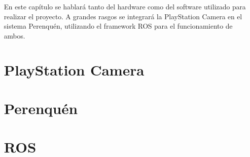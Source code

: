 
En este capítulo se hablará tanto del hardware como del software utilizado para
realizar el proyecto. A grandes rasgos se integrará la PlayStation Camera en el
sistema Perenquén, utilizando el framework ROS para el funcionamiento de ambos.


\section{PlayStation Camera}
\label{3:sec1}


\section{Perenquén}
\label{3:sec2}


\section{ROS}
\label{3:sec3}

